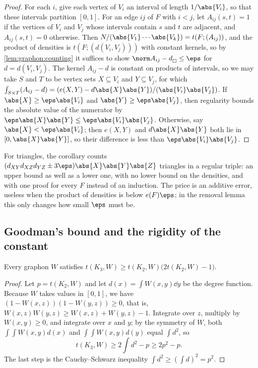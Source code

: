 \begin{refsection}
\begin{proof}
For each $i$, give each vertex of $V_i$ an interval of length $1/\abs{V_i}$, so that these intervals partition $[0,1]$. For an edge $ij$ of $F$ with $i<j$, let $A_{ij}(s,t)=1$ if the vertices of $V_i$ and $V_j$ whose intervals contain $s$ and $t$ are adjacent, and $A_{ij}(s,t)=0$ otherwise. Then $N/(\abs{V_1}\cdots\abs{V_k})=t(F;(A_{ij}))$, and the product of densities is $t(F;(d(V_i,V_j)))$ with constant kernels, so by \cref{lem:graphon:counting} it suffices to show $\graphoncut{A_{ij}-d}\le\eps$ for $d=d(V_i,V_j)$. The kernel $A_{ij}-d$ is constant on products of intervals, so we may take $S$ and $T$ to be vertex sets $X\subseteq V_i$ and $Y\subseteq V_j$, for which $\int_{S\times T}(A_{ij}-d)=(e(X,Y)-d\abs{X}\abs{Y})/(\abs{V_i}\abs{V_j})$. If $\abs{X}\ge\eps\abs{V_i}$ and $\abs{Y}\ge\eps\abs{V_j}$, then regularity bounds the absolute value of the numerator by $\eps\abs{X}\abs{Y}\le\eps\abs{V_i}\abs{V_j}$. Otherwise, say $\abs{X}<\eps\abs{V_i}$; then $e(X,Y)$ and $d\abs{X}\abs{Y}$ both lie in $[0,\abs{X}\abs{Y}]$, so their difference is less than $\eps\abs{V_i}\abs{V_j}$.
\end{proof}

For triangles, the corollary counts $(d_{XY}d_{XZ}d_{YZ}\pm3\eps)\abs{X}\abs{Y}\abs{Z}$ triangles in a regular triple: an upper bound as well as a lower one, with no lower bound on the densities, and with one proof for every $F$ instead of an induction. The price is an additive error, useless when the product of densities is below $e(F)\eps$; in the removal lemma this only changes how small $\eps$ must be.

\subsection{Goodman's bound and the rigidity of the constant}

\begin{theorem}\label{thm:graphon:goodman}
Every graphon $W$ satisfies $t(K_3,W)\ge t(K_2,W)\bigl(2t(K_2,W)-1\bigr)$.
\end{theorem}

\begin{proof}
Let $p=t(K_2,W)$ and let $d(x)=\int W(x,y)\dd y$ be the degree function. Because $W$ takes values in $[0,1]$, we have $(1-W(x,z))(1-W(y,z))\ge0$, that is, $W(x,z)W(y,z)\ge W(x,z)+W(y,z)-1$. Integrate over $z$, multiply by $W(x,y)\ge0$, and integrate over $x$ and $y$; by the symmetry of $W$, both $\int\!\!\int W(x,y)d(x)$ and $\int\!\!\int W(x,y)d(y)$ equal $\int d^2$, so
\[
  t(K_3,W)\ge2\int d^2-p\ge2p^2-p .
\]
The last step is the Cauchy--Schwarz inequality $\int d^2\ge(\int d)^2=p^2$.
\end{proof}


\end{refsection}
